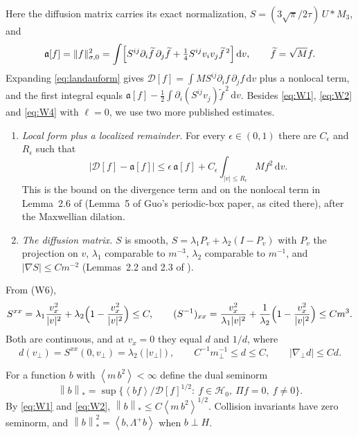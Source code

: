 \documentclass[11pt]{article}
\newcommand{\dd}{\,\mathrm d}
\newcommand{\av}[1]{\left\langle #1\right\rangle}
\newcommand{\D}{\mathcal D}
\newcommand{\HH}{\mathcal H}
\newcommand{\nstar}[1]{\left\|#1\right\|_*}
\newcommand{\dual}[1]{\left\langle #1,\Lambda^+ #1\right\rangle}
\theoremstyle{definition}
\theoremstyle{remark}
\numberwithin{equation}{section}
\begin{document}
Here the diffusion matrix carries its exact normalization,
$S=(3\sqrt\pi/2\tau)\,U*M_3$, and
\[
 \mathfrak a[f]=\|f\|_{\sigma,0}^2
   =\int\Bigl[S^{ij}\partial_i\widetilde f\,\partial_j\widetilde f
     +\tfrac14S^{ij}v_iv_j\widetilde f^{\,2}\Bigr]\dd v,
 \qquad\widetilde f=\sqrt M f .
\]
Expanding \eqref{eq:landauform} gives
$\D[f]=\int MS^{ij}\partial_if\,\partial_jf\dd v$ plus a nonlocal term, and
the first integral equals $\mathfrak a[f]-\tfrac12\int\partial_i(S^{ij}v_j)
\widetilde f^{\,2}\dd v$. Besides \eqref{eq:W1}, \eqref{eq:W2} and
\eqref{eq:W4} with $\ell=0$, we use two more published estimates.
\begin{enumerate}[label=(W\arabic*),start=5]
\item \emph{Local form plus a localized remainder.} For every
$\epsilon\in(0,1)$ there are $C_\epsilon$ and $R_\epsilon$ such that
\begin{equation}
 \bigl|\D[f]-\mathfrak a[f]\bigr|\leq\epsilon\,\mathfrak a[f]
   +C_\epsilon\int_{|v|\leq R_\epsilon}M f^2\dd v .
 \label{eq:W5}
\end{equation}
This is the bound on the divergence term and on the nonlocal term in
Lemma~2.6 of \cite{KimGuoHwang2020} (Lemma~5 of Guo's periodic-box paper,
as cited there), after the Maxwellian dilation.
\item \emph{The diffusion matrix.} $S$ is smooth,
$S=\lambda_1P_v+\lambda_2(I-P_v)$ with $P_v$ the projection on $v$,
$\lambda_1$ comparable to $m^{-3}$, $\lambda_2$ comparable to $m^{-1}$, and
$|\nabla S|\leq Cm^{-2}$ (Lemmas~2.2 and 2.3 of \cite{KimGuoHwang2020}).
\end{enumerate}
From (W6),
\begin{equation}
 S^{xx}=\lambda_1\frac{v_x^2}{|v|^2}
        +\lambda_2\Bigl(1-\frac{v_x^2}{|v|^2}\Bigr)\leq C,\qquad
 (S^{-1})_{xx}=\frac{v_x^2}{\lambda_1|v|^2}
        +\frac1{\lambda_2}\Bigl(1-\frac{v_x^2}{|v|^2}\Bigr)\leq Cm^3 .
 \label{eq:Sxx}
\end{equation}
Both are continuous, and at $v_x=0$ they equal $d$ and $1/d$, where
\begin{equation}
 d(v_\perp)=S^{xx}(0,v_\perp)=\lambda_2(|v_\perp|),\qquad
 C^{-1}m_\perp^{-1}\leq d\leq C,\qquad|\nabla_\perp d|\leq Cd .
 \label{eq:dprops}
\end{equation}

For a function $b$ with $\av{m\,b^2}<\infty$ define the dual seminorm
\[
 \nstar b=\sup\bigl\{\av{bf}/\D[f]^{1/2}:\ f\in\HH_0,\ \Pi f=0,\
 f\ne0\bigr\}.
\]
By \eqref{eq:W1} and \eqref{eq:W2},
$\nstar b\leq C\av{m\,b^2}^{1/2}$. Collision invariants have zero
seminorm, and $\nstar b^2=\dual b$ when $b\perp H$.
\end{document}
